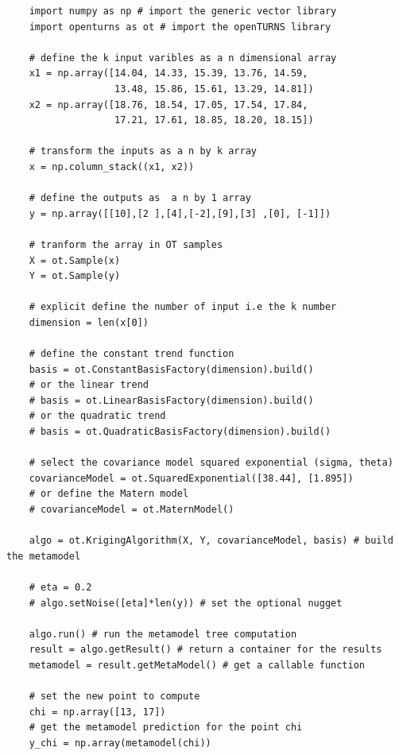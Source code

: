 

\begin{verbatim}
	import numpy as np # import the generic vector library
	import openturns as ot # import the openTURNS library
	
	# define the k input varibles as a n dimensional array
	x1 = np.array([14.04, 14.33, 15.39, 13.76, 14.59,
				   13.48, 15.86, 15.61, 13.29, 14.81])
	x2 = np.array([18.76, 18.54, 17.05, 17.54, 17.84,
	               17.21, 17.61, 18.85, 18.20, 18.15])
	
	# transform the inputs as a n by k array
	x = np.column_stack((x1, x2))
	
	# define the outputs as  a n by 1 array
	y = np.array([[10],[2 ],[4],[-2],[9],[3] ,[0], [-1]])
	
	# tranform the array in OT samples
	X = ot.Sample(x)
	Y = ot.Sample(y)
	
	# explicit define the number of input i.e the k number
	dimension = len(x[0])
	
	# define the constant trend function
	basis = ot.ConstantBasisFactory(dimension).build()
	# or the linear trend
	# basis = ot.LinearBasisFactory(dimension).build()
	# or the quadratic trend
	# basis = ot.QuadraticBasisFactory(dimension).build()
	
	# select the covariance model squared exponential (sigma, theta)
	covarianceModel = ot.SquaredExponential([38.44], [1.895])
	# or define the Matern model
	# covarianceModel = ot.MaternModel()
	
	algo = ot.KrigingAlgorithm(X, Y, covarianceModel, basis) # build the metamodel
	
	# eta = 0.2
	# algo.setNoise([eta]*len(y)) # set the optional nugget
	
	algo.run() # run the metamodel tree computation
	result = algo.getResult() # return a container for the results
	metamodel = result.getMetaModel() # get a callable function
	
	# set the new point to compute
	chi = np.array([13, 17])
	# get the metamodel prediction for the point chi
	y_chi = np.array(metamodel(chi))
\end{verbatim}

